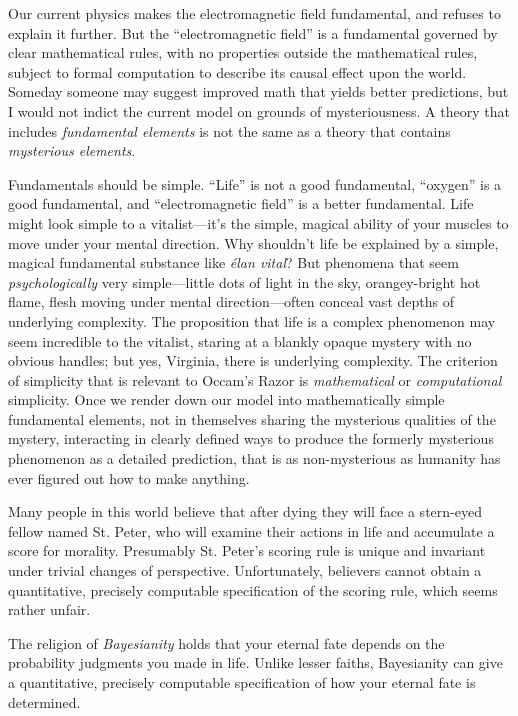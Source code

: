 {
 Our current physics makes the electromagnetic field fundamental,
and refuses to explain it further. But the
``electromagnetic field'' is a
fundamental governed by clear mathematical rules, with no properties
outside the mathematical rules, subject to formal computation to
describe its causal effect upon the world. Someday someone may suggest
improved math that yields better predictions, but I would not indict
the current model on grounds of mysteriousness. A theory that includes
\textit{fundamental elements} is not the same as a theory that contains
\textit{mysterious elements}.}

{
 Fundamentals should be simple.
``Life'' is not a good fundamental,
``oxygen'' is a good fundamental,
and ``electromagnetic field'' is a
better fundamental. Life might look simple to a
vitalist---it's the simple, magical ability of your
muscles to move under your mental direction. Why
shouldn't life be explained by a simple, magical
fundamental substance like \textit{élan vital}? But phenomena that seem
\textit{psychologically} very simple---little dots of light in the sky,
orangey-bright hot flame, flesh moving under mental direction---often
conceal vast depths of underlying complexity. The proposition that life
is a complex phenomenon may seem incredible to the vitalist, staring at
a blankly opaque mystery with no obvious handles; but yes, Virginia,
there is underlying complexity. The criterion of simplicity that is
relevant to Occam's Razor is \textit{mathematical} or
\textit{computational} simplicity. Once we render down our model into
mathematically simple fundamental elements, not in themselves sharing
the mysterious qualities of the mystery, interacting in clearly defined
ways to produce the formerly mysterious phenomenon as a detailed
prediction, that is as non-mysterious as humanity has ever figured out
how to make anything.}

\hr

{
 Many people in this world believe that after dying they will face
a stern-eyed fellow named St. Peter, who will examine their actions in
life and accumulate a score for morality. Presumably St.
Peter's scoring rule is unique and invariant under
trivial changes of perspective. Unfortunately, believers cannot obtain
a quantitative, precisely computable specification of the scoring rule,
which seems rather unfair.}

{
 The religion of \textit{Bayesianity} holds that your eternal fate
depends on the probability judgments you made in life. Unlike lesser
faiths, Bayesianity can give a quantitative, precisely computable
specification of how your eternal fate is determined.}

